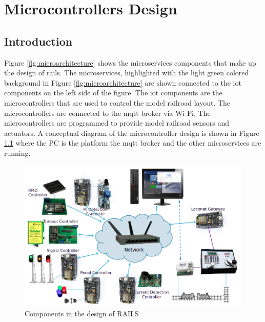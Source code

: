 \chapter{Microcontrollers Design}
\label{chap:microcontrollers-design}
\section{Introduction}
\label{sec:introduction}
Figure \ref{fig:microarchitecture} shows the microservices components that make up the design of \gls{rails}. The microservices,
highlighted with the light green colored background in Figure \ref{fig:microarchitecture} are shown connected to the \gls{iot} components on the left side of the figure.
The \gls{iot} components are the microcontrollers that are used to control the model railroad layout. The microcontrollers are connected to the \gls{mqtt} broker via Wi-Fi. 
The microcontrollers are programmed to provide model railroad sensors and actuators. A conceptual diagram of the microcontroller design is shown in Figure 
\ref{fig:system-concept} where the PC is the platform the \gls{mqtt} broker and the other microservices are running.
\begin{figure}[htbp]
    \centering
    \includegraphics[scale=0.5]{system-concept.png}
    \caption{Components in the design of RAILS}
    \label{fig:system-concept}
\end{figure}

